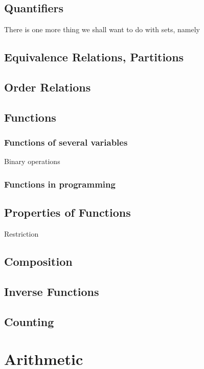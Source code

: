 \section{Quantifiers}

There is one more thing we shall want to do with sets, namely

\section{Equivalence Relations, Partitions}

\section{Order Relations}

\section{Functions}


\subsection{Functions of several variables}

Binary operations

\subsection{Functions in programming}

\section{Properties of Functions}

Restriction

\section{Composition}

\section{Inverse Functions}

\section{Counting}

\chapter{Arithmetic}


